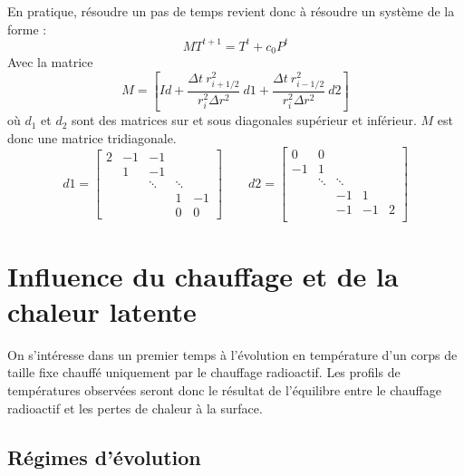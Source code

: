 \documentclass[10pt,a4paper]{article}
\numberwithin{equation}{section}
\begin{document}
En pratique, résoudre un pas de temps revient donc à résoudre un système de la forme :
\begin{equation}
MT^{t+1} = T^t + c_0 P^{t}
\end{equation}
Avec la matrice $$M = \left[ Id + \frac{\Delta t ~ r^2_{i+1/2}}{r^2_i \Delta r^2} ~ d1 + \frac{\Delta t ~ r^2_{i-1/2}}{r^2_i \Delta r^2} ~ d2  \right]$$
où $d_1$ et $d_2$ sont des matrices sur et sous diagonales supérieur et inférieur. $M$ est donc une matrice tridiagonale.
$$
d1=
\begin{bmatrix}
    2      & -1     & -1       &   \\
           &  1     & -1              &             \\
     &        & \ddots    &\ddots       \\
     &        &            & 1 & -1         \\
         &   &      &   0         &  0
\end{bmatrix}
\qquad
d2=
\begin{bmatrix}
     0     & 0      &   &     &        \\
    -1     & 1      &  &          &            \\
     & \ddots & \ddots &    &      \\
     &              &  -1      &  1         \\
         &      &  -1     & -1        & 2 \\
\end{bmatrix}
$$

\section{Influence du chauffage et de la chaleur latente}
On s'intéresse dans un premier temps à l'évolution en température d'un corps de taille fixe chauffé uniquement par le chauffage radioactif. Les profils de températures observées seront donc le résultat de l'équilibre entre le chauffage radioactif et les pertes de chaleur à la surface.

\subsection{Régimes d'évolution}
\end{document}
